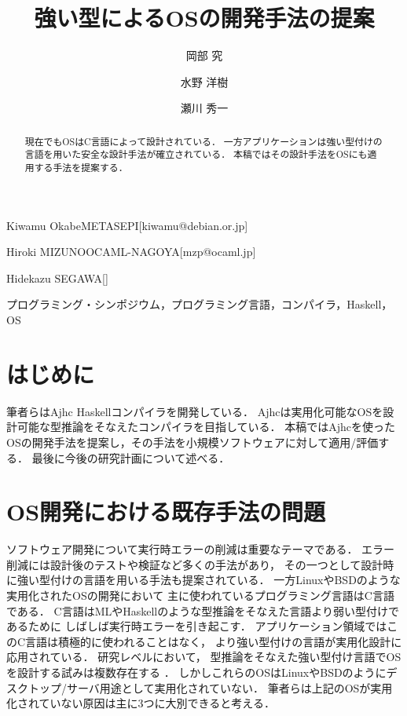 \documentclass[submit,techreq,noauthor]{ipsj}
\begin{document}
\title{強い型によるOSの開発手法の提案}


\author{岡部 究}{Kiwamu Okabe}{METASEPI}[kiwamu@debian.or.jp]
\author{水野 洋樹}{Hiroki MIZUNO}{OCAML-NAGOYA}[mzp@ocaml.jp]
\author{瀬川 秀一}{Hidekazu SEGAWA}{}[]

\begin{abstract}
現在でもOSはC言語によって設計されている．
一方アプリケーションは強い型付けの言語を用いた安全な設計手法が確立されている．
本稿ではその設計手法をOSにも適用する手法を提案する．
\end{abstract}

\begin{jkeyword}
プログラミング・シンポジウム，プログラミング言語，コンパイラ，Haskell，OS
\end{jkeyword}

\maketitle

\section{はじめに}

筆者らはAjhc Haskellコンパイラ\cite{ajhc}を開発している．
Ajhcは実用化可能なOSを設計可能な型推論をそなえたコンパイラを目指している．
本稿ではAjhcを使ったOSの開発手法を提案し，その手法を小規模ソフトウェアに対して適用/評価する．
最後に今後の研究計画について述べる．

\section{OS開発における既存手法の問題}
\label{sec:problems}

ソフトウェア開発について実行時エラーの削減は重要なテーマである．
エラー削減には設計後のテストや検証など多くの手法があり，
その一つとして設計時に強い型付けの言語を用いる手法も提案されている．
一方LinuxやBSDのような実用化されたOSの開発において
主に使われているプログラミング言語はC言語である．
C言語はMLやHaskellのような型推論をそなえた言語より弱い型付けであるために
しばしば実行時エラーを引き起こす．
アプリケーション領域ではこのC言語は積極的に使われることはなく，
より強い型付けの言語が実用化設計に応用されている．
研究レベルにおいて，
型推論をそなえた強い型付け言語でOSを設計する試みは複数存在する
\cite{funk}\cite{snowflake-os}\cite{house}．
しかしこれらのOSはLinuxやBSDのようにデスクトップ/サーバ用途として実用化されていない．
筆者らは上記のOSが実用化されていない原因は主に3つに大別できると考える．
\end{document}

